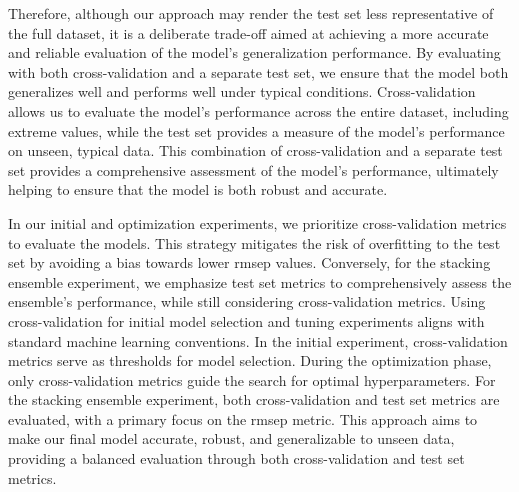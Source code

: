 Therefore, although our approach may render the test set less representative of the full dataset, it is a deliberate trade-off aimed at achieving a more accurate and reliable evaluation of the model's generalization performance.
By evaluating with both cross-validation and a separate test set, we ensure that the model both generalizes well and performs well under typical conditions.
Cross-validation allows us to evaluate the model's performance across the entire dataset, including extreme values, while the test set provides a measure of the model's performance on unseen, typical data.
This combination of cross-validation and a separate test set provides a comprehensive assessment of the model's performance, ultimately helping to ensure that the model is both robust and accurate.

In our initial and optimization experiments, we prioritize cross-validation metrics to evaluate the models.
This strategy mitigates the risk of overfitting to the test set by avoiding a bias towards lower \gls{rmsep} values.
Conversely, for the stacking ensemble experiment, we emphasize test set metrics to comprehensively assess the ensemble's performance, while still considering cross-validation metrics.
Using cross-validation for initial model selection and tuning experiments aligns with standard machine learning conventions\cite{geronHandsonMachineLearning2023}.
In the initial experiment, cross-validation metrics serve as thresholds for model selection.
During the optimization phase, only cross-validation metrics guide the search for optimal hyperparameters.
For the stacking ensemble experiment, both cross-validation and test set metrics are evaluated, with a primary focus on the \gls{rmsep} metric.
This approach aims to make our final model accurate, robust, and generalizable to unseen data, providing a balanced evaluation through both cross-validation and test set metrics.
